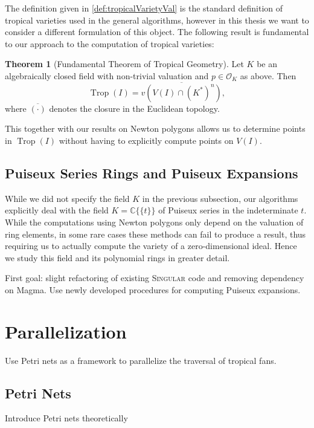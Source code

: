 \documentclass[
  paper=a4,
  DIV=14,
  fontsize=12pt,
  titlepage,
  bibliography=totoc,
  pagesize=pdftex
]{scrartcl}
\numberwithin{figure}{section}
\numberwithin{equation}{section}
\numberwithin{table}{section}
\newcommand*\setC{\mathds{C}}
\newcommand*\puiseux[2]{#1\{\!\{#2\}\!\}}
\newcommand*\CCt{\puiseux{\setC}{t}}
\DeclareMathOperator{\Trop}{Trop}
\theoremstyle{definition}
\newtheorem{theorem}[definition]{Theorem}
\numberwithin{definition}{section}
\begin{document}
The definition given in \ref{def:tropicalVarietyVal} is the standard definition of
tropical varieties used in the general algorithms, however in this thesis we want to
consider a different formulation of this object. The following result is fundamental to
our approach to the computation of tropical varieties:

\begin{theorem}[Fundamental Theorem of Tropical Geometry]
  Let $K$ be an algebraically closed field with non-trivial valuation and $p\in \mathcal
  O_K$ as above. Then
  \[
    \Trop(I) = \overline{v(V(I) \cap (K^\ast)^n)},
  \]
  where $\overline{(\cdot)}$ denotes the closure in the Euclidean topology.
  \label{thm:fundamentalThmTropicalGeometry}
\end{theorem}

This together with our results on Newton polygons allows us to determine points in
$\Trop(I)$ without having to explicitly compute points on $V(I)$.

\subsection{Puiseux Series Rings and Puiseux Expansions}

While we did not specify the field $K$ in the previous subsection, our algorithms
explicitly deal with the field $K = \CCt$ of Puiseux series in the indeterminate
$t$. While the computations using Newton polygons only depend on the valuation of ring
elements, in some rare cases these methods can fail to produce a result, thus requiring us
to actually compute the variety of a zero-dimensional ideal. Hence we study this field and
its polynomial rings in greater detail.

First goal: slight refactoring of existing \textsc{Singular} code and removing dependency on
Magma. Use newly developed procedures for computing Puiseux expansions.

\section{Parallelization}

Use Petri nets as a framework to parallelize the traversal of tropical fans.

\subsection{Petri Nets}

Introduce Petri nets theoretically
\end{document}
